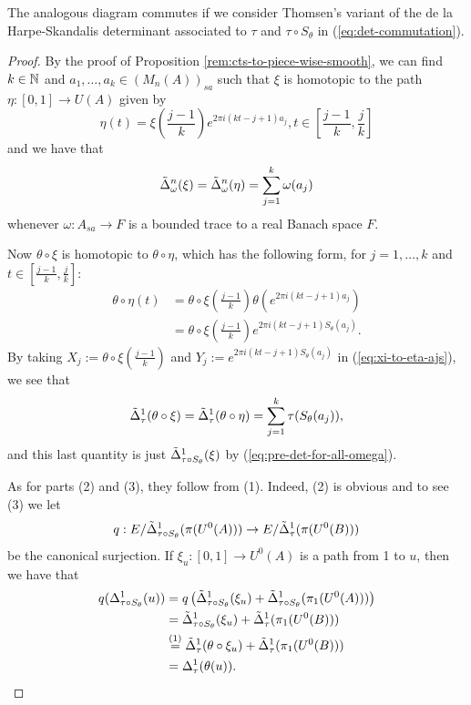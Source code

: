 \documentclass[12pt]{amsart}
\begin{document}
\begin{prop}
\begin{enumerate}
The analogous diagram commutes if we consider Thomsen's variant of the de la Harpe-Skandalis determinant associated to $\tau$ and $\tau \circ S_\theta$ in (\ref{eq:det-commutation}). 
\end{enumerate}
\begin{proof}
By the proof of Proposition \ref{rem:cts-to-piece-wise-smooth}, we can find $k \in \mathbb{N}$ and $a_1,\dots,a_k \in (M_n(A))_{sa}$ such that $\xi$ is homotopic to the path $\eta: [0,1] \to U(A)$ given by
\begin{equation}\label{eq:exponential-prod}
\eta(t) = \xi\left(\frac{j-1}{k}\right)e^{2\pi i(kt - j + 1)a_j}, t \in \left[\frac{j-1}{k},\frac{j}{k}\right]
\end{equation}
and we have that
\begin{equation}\label{eq:pre-det-for-all-omega}
\tilde{\Delta}_\omega^n(\xi) = \tilde{\Delta}_\omega^n(\eta) = \sum_{j=1}^k \omega(a_j)
\end{equation}
whenever $\omega: A_{sa} \to F$ is a bounded trace to a real Banach space $F$. 

Now $\theta \circ \xi$ is homotopic to $\theta \circ \eta$, which has the following form, for $j=1,\dots,k$ and $t \in [\frac{j-1}{k},\frac{j}{k}]$:
\begin{equation}
\begin{split}
\theta \circ \eta(t) &= \theta \circ \xi\left(\frac{j-1}{k}\right)\theta\left(e^{2\pi i (kt - j + 1)a_j}\right) \\
&= \theta \circ \xi\left(\frac{j-1}{k}\right)e^{2\pi i (kt - j + 1)S_\theta(a_j)}.
\end{split}
\end{equation}
By taking $X_j := \theta \circ \xi\left(\frac{j-1}{k}\right)$ and $Y_j := e^{2\pi i (kt - j + 1)S_\theta(a_j)}$ in (\ref{eq:xi-to-eta-ajs}), we see that
\begin{equation}
\tilde{\Delta}_\tau^1(\theta \circ \xi) = \tilde{\Delta}_\tau^1(\theta \circ \eta) = \sum_{j=1}^k \tau(S_\theta(a_j)),
\end{equation}
and this last quantity is just $\tilde{\Delta}_{\tau \circ S_\theta}^1(\xi)$ by (\ref{eq:pre-det-for-all-omega}). 

As for parts (2) and (3), they follow from (1). Indeed, (2) is obvious and to see (3) we let
\begin{equation}
q: E/\tilde{\Delta}_{\tau \circ S_\theta}^1(\pi(U^0(A))) \to E/\tilde{\Delta}_\tau^1(\pi(U^0(B)))
\end{equation}
be the canonical surjection. If $\xi_u: [0,1] \to U^0(A)$ is a path from 1 to $u$, then we have that
\begin{equation}
\begin{split}
q(\Delta_{\tau \circ S_\theta}^1(u)) &= q\left(\tilde{\Delta}_{\tau \circ S_\theta}^1(\xi_u) + \tilde{\Delta}_{\tau \circ S_\theta}^1(\pi_1(U^0(A)))\right) \\
&= \tilde{\Delta}_{\tau \circ S_\theta}^1(\xi_u) + \tilde{\Delta}_\tau^1(\pi_1(U^0(B))) \\
&\overset{(1)}{=} \tilde{\Delta}_\tau^1(\theta \circ \xi_u) + \tilde{\Delta}_\tau^1(\pi_1(U^0(B))) \\
&= \Delta_\tau^1(\theta(u)).
\end{split}
\end{equation}


\end{proof}
\end{prop}
\end{document}
